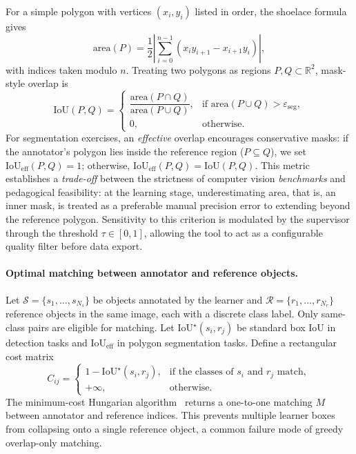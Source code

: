 \documentclass[runningheads]{llncs}
\begin{document}
For a simple polygon with vertices $(x_i,y_i)$ listed in order, the shoelace formula gives
\begin{equation}
\mathrm{area}(P)=\frac{1}{2}\left|\sum_{i=0}^{n-1}\left(x_i y_{i+1}-x_{i+1} y_i\right)\right|,
\end{equation}
with indices taken modulo $n$. Treating two polygons as regions $P,Q \subset \mathbb{R}^2$, mask-style overlap is
\begin{equation}
\mathrm{IoU}(P,Q)=
\begin{cases}
\dfrac{\mathrm{area}(P\cap Q)}{\mathrm{area}(P\cup Q)}, & \text{if } \mathrm{area}(P\cup Q)>\varepsilon_{\mathrm{seg}},\\
0, & \text{otherwise}.
\end{cases}
\end{equation}
For segmentation exercises, an \emph{effective} overlap encourages conservative masks: if the annotator's polygon lies inside the reference region ($P \subseteq Q$), we set $\mathrm{IoU}_{\mathrm{eff}}(P,Q)=1$; otherwise, $\mathrm{IoU}_{\mathrm{eff}}(P,Q)=\mathrm{IoU}(P,Q)$. This metric establishes a \textit{trade-off} between the strictness of computer vision \textit{benchmarks} and pedagogical feasibility: at the learning stage, underestimating area, that is, an inner mask, is treated as a preferable manual precision error to extending beyond the reference polygon. Sensitivity to this criterion is modulated by the supervisor through the threshold $\tau \in [0,1]$, allowing the tool to act as a configurable quality filter before data export.

\paragraph{Optimal matching between annotator and reference objects.}
Let $\mathcal{S}=\{s_1,\dots,s_{N_s}\}$ be objects annotated by the learner and $\mathcal{R}=\{r_1,\dots,r_{N_r}\}$ reference objects in the same image, each with a discrete class label. Only same-class pairs are eligible for matching. Let $\mathrm{IoU}^{\star}(s_i,r_j)$ be standard box IoU in detection tasks and $\mathrm{IoU}_{\mathrm{eff}}$ in polygon segmentation tasks. Define a rectangular cost matrix
\begin{equation}
C_{ij}=
\begin{cases}
1-\mathrm{IoU}^{\star}(s_i,r_j), & \text{if the classes of } s_i \text{ and } r_j \text{ match},\\
+\infty, & \text{otherwise}.
\end{cases}
\end{equation}
The minimum-cost Hungarian algorithm~\cite{kuhn1955hungarian} returns a one-to-one matching $M$ between annotator and reference indices. This prevents multiple learner boxes from collapsing onto a single reference object, a common failure mode of greedy overlap-only matching.
\end{document}
